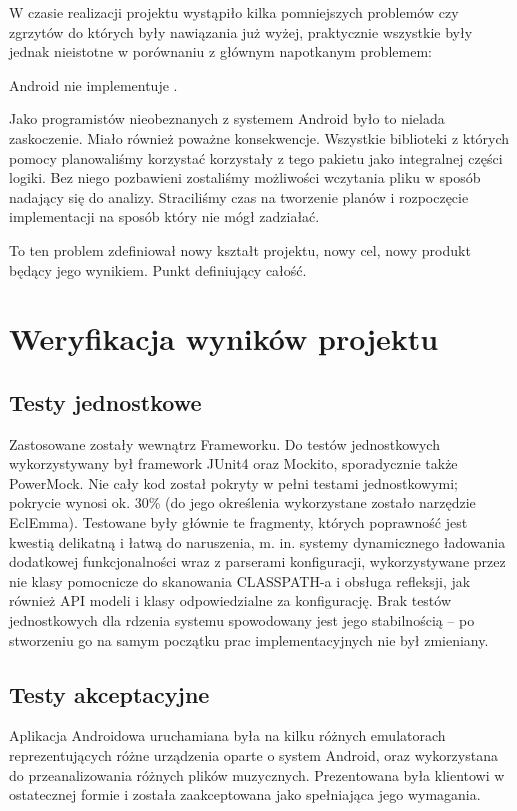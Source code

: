 W czasie realizacji projektu wystąpiło kilka pomniejszych problemów czy zgrzytów do których były nawiązania już wyżej, praktycznie wszystkie były jednak nieistotne w porównaniu z głównym napotkanym problemem:

Android nie implementuje .

Jako programistów nieobeznanych z systemem Android było to nielada zaskoczenie. Miało również poważne konsekwencje. Wszystkie biblioteki z których pomocy planowaliśmy korzystać korzystały z tego pakietu jako integralnej części logiki. Bez niego pozbawieni zostaliśmy możliwości wczytania pliku w sposób nadający się do analizy. Straciliśmy czas na tworzenie planów i rozpoczęcie implementacji na sposób który nie mógł zadziałać.

To ten problem zdefiniował nowy kształt projektu, nowy cel, nowy produkt będący jego wynikiem. Punkt definiujący całość.

\chapter{Weryfikacja wyników projektu}

\section{Testy jednostkowe}
Zastosowane zostały wewnątrz Frameworku. Do testów jednostkowych wykorzystywany był framework JUnit4 oraz Mockito, sporadycznie także
PowerMock. Nie cały kod został pokryty w pełni testami jednostkowymi; pokrycie wynosi ok. 30\% (do
jego określenia wykorzystane zostało narzędzie EclEmma). Testowane były głównie te fragmenty,
których poprawność jest kwestią delikatną i łatwą do naruszenia, m. in. systemy dynamicznego
ładowania dodatkowej funkcjonalności wraz z parserami konfiguracji, wykorzystywane przez nie klasy
pomocnicze do skanowania CLASSPATH-a i obsługa refleksji, jak również API modeli i klasy
odpowiedzialne za konfigurację. Brak testów jednostkowych dla rdzenia systemu spowodowany jest jego
stabilnością -- po stworzeniu go na samym początku prac implementacyjnych nie był zmieniany.

\section{Testy akceptacyjne}
Aplikacja Androidowa uruchamiana była na kilku różnych emulatorach reprezentujących różne urządzenia oparte o system Android, oraz wykorzystana do przeanalizowania różnych plików muzycznych. Prezentowana była klientowi w ostatecznej formie i została zaakceptowana jako spełniająca jego wymagania.

